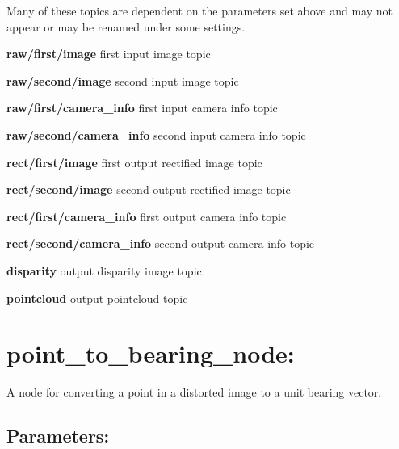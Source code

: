 Many of these topics are dependent on the parameters set above and may not appear or may be renamed under some settings.
\begin{DoxyItemize}
\item {\bfseries raw/first/image} first input image topic
\item {\bfseries raw/second/image} second input image topic
\item {\bfseries raw/first/camera\+\_\+info} first input camera info topic
\item {\bfseries raw/second/camera\+\_\+info} second input camera info topic
\item {\bfseries rect/first/image} first output rectified image topic
\item {\bfseries rect/second/image} second output rectified image topic
\item {\bfseries rect/first/camera\+\_\+info} first output camera info topic
\item {\bfseries rect/second/camera\+\_\+info} second output camera info topic
\item {\bfseries disparity} output disparity image topic
\item {\bfseries pointcloud} output pointcloud topic
\end{DoxyItemize}\hypertarget{md_vision_layer_image_undistort_README_autotoc_md112}{}\section{point\+\_\+to\+\_\+bearing\+\_\+node\+:}\label{md_vision_layer_image_undistort_README_autotoc_md112}
A node for converting a point in a distorted image to a unit bearing vector.\hypertarget{md_vision_layer_image_undistort_README_autotoc_md113}{}\subsection{Parameters\+:}\label{md_vision_layer_image_undistort_README_autotoc_md113}

